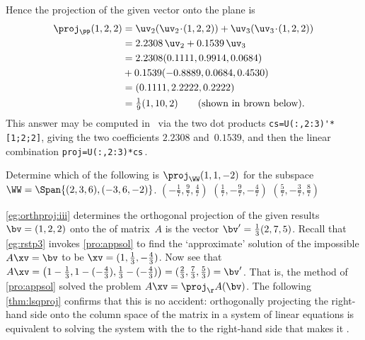 \begin{example}
\begin{enumerate}[ref=\ref{eg:orthproj}(\alph*)]
\begin{solution}
\begin{center}\end{center}
Hence the projection of the given vector onto the plane is
\begin{align*}
\proj_\PP(1,2,2)
&=\uv_2(\uv_2\cdot(1,2,2))+\uv_3(\uv_3\cdot(1,2,2))
\\&=2.2308\,\uv_2+0.1539\,\uv_3
\\&=2.2308(0.1111,0.9914,0.0684)
\\&{}+0.1539(-0.8889,0.0684,0.4530)
\\&=(0.1111,2.2222,0.2222)
\\&=\tfrac19(1,10,2)
\qquad(\text{shown in brown below}).
\end{align*}
This answer may be computed in \script\ via the two dot products \verb|cs=U(:,2:3)'*[1;2;2]|, giving the two coefficients \(2.2308\) and~\(0.1539\), and then the linear combination \verb|proj=U(:,2:3)*cs|\,.
\begin{center}\end{center}
\end{solution}
\end{enumerate}
\end{example}



\begin{activity}
Determine which of the following is \(\proj_\WW(1,1,-2)\) for the subspace \(\WW=\Span\{(2,3,6), (-3,6,-2)\}\).
{\((-\frac17,\frac97,\frac47)\)}
{\((\frac17,-\frac97,-\frac47)\)}
{\((\frac57,-\frac37,\frac87)\)}
\end{activity}




\cref{eg:orthproj:iii} determines the orthogonal projection of the given  results \(\bv=(1,2,2)\) onto the  of matrix~\(A\) is the vector \(\bv'=\tfrac13(2,7,5)\).
Recall that \cref{eg:rstp3} invokes \cref{pro:appsol} to find the `approximate' solution of the impossible \(A\xv=\bv\) to be \(\xv=(1,\frac13,-\frac43)\).
Now see that \(A\xv
=\big(1-\frac13,1-(-\frac43),\frac13-(-\frac43)\big)
=(\frac23,\frac73,\frac53)
=\bv'\).
That is, the  method of \cref{pro:appsol} solved the problem \(A\xv=\proj_\AA(\bv)\).
The following \cref{thm:lsqproj} confirms that this is no accident: orthogonally projecting the right-hand side onto the column space of the matrix in a system of linear equations is equivalent to solving the system with the  to the right-hand side that makes it .


